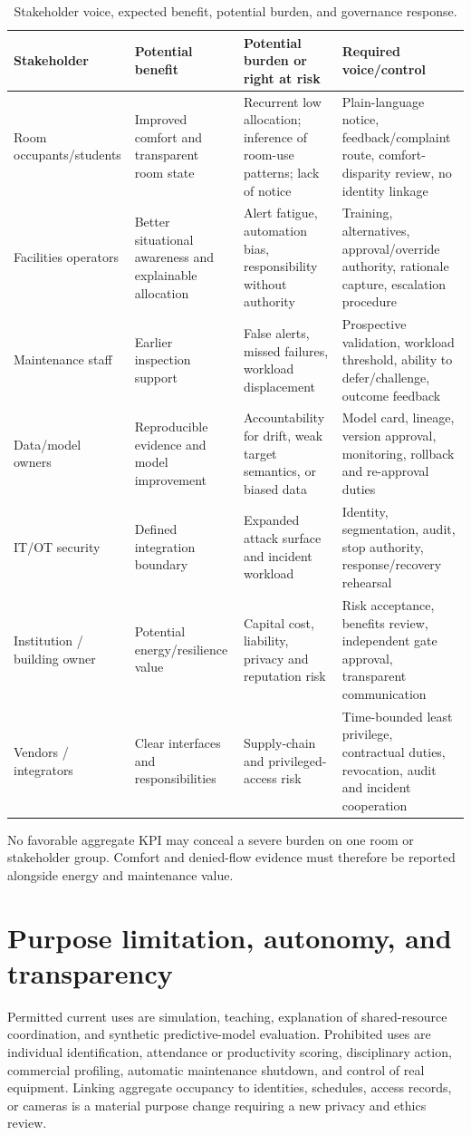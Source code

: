 \begin{table}[H]
\centering
\caption{Stakeholder voice, expected benefit, potential burden, and governance response.}
\label{tab:stakeholders}
\begin{tabularx}{\textwidth}{L{0.16\textwidth}Y Y Y}
\toprule
Stakeholder & Potential benefit & Potential burden or right at risk & Required voice/control\\
\midrule
Room occupants/students & Improved comfort and transparent room state & Recurrent low allocation; inference of room-use patterns; lack of notice & Plain-language notice, feedback/complaint route, comfort-disparity review, no identity linkage\\
Facilities operators & Better situational awareness and explainable allocation & Alert fatigue, automation bias, responsibility without authority & Training, alternatives, approval/override authority, rationale capture, escalation procedure\\
Maintenance staff & Earlier inspection support & False alerts, missed failures, workload displacement & Prospective validation, workload threshold, ability to defer/challenge, outcome feedback\\
Data/model owners & Reproducible evidence and model improvement & Accountability for drift, weak target semantics, or biased data & Model card, lineage, version approval, monitoring, rollback and re-approval duties\\
IT/OT security & Defined integration boundary & Expanded attack surface and incident workload & Identity, segmentation, audit, stop authority, response/recovery rehearsal\\
Institution / building owner & Potential energy/resilience value & Capital cost, liability, privacy and reputation risk & Risk acceptance, benefits review, independent gate approval, transparent communication\\
Vendors / integrators & Clear interfaces and responsibilities & Supply-chain and privileged-access risk & Time-bounded least privilege, contractual duties, revocation, audit and incident cooperation\\
\bottomrule
\end{tabularx}
\end{table}
No favorable aggregate KPI may conceal a severe burden on one room or stakeholder group. Comfort and denied-flow evidence must therefore be reported alongside energy and maintenance value.

\section{Purpose limitation, autonomy, and transparency}
Permitted current uses are simulation, teaching, explanation of shared-resource coordination, and synthetic predictive-model evaluation. Prohibited uses are individual identification, attendance or productivity scoring, disciplinary action, commercial profiling, automatic maintenance shutdown, and control of real equipment. Linking aggregate occupancy to identities, schedules, access records, or cameras is a material purpose change requiring a new privacy and ethics review.

